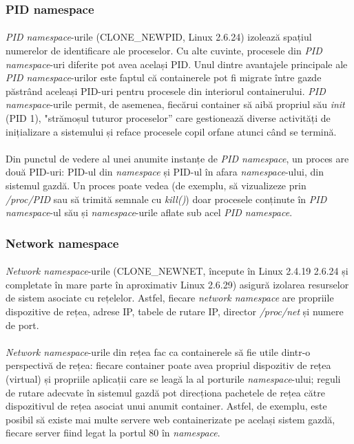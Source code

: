         \subsubsection{PID namespace}
            \paragraph{} \textit{PID namespace}-urile (CLONE\_NEWPID, Linux 2.6.24) izolează spațiul numerelor de identificare ale proceselor. Cu alte cuvinte, procesele din \textit{PID namespace}-uri diferite pot avea același PID. Unul dintre avantajele principale ale \textit{PID namespace}-urilor este faptul că containerele pot fi migrate între gazde păstrând aceleași PID-uri pentru procesele din interiorul containerului. \textit{PID namespace}-urile permit, de asemenea, fiecărui container să aibă propriul său \textit{init} (PID 1), "strămoșul tuturor proceselor” care gestionează diverse activități de inițializare a sistemului și reface procesele copil orfane atunci când se termină. \cite{ns:lwn}
            \paragraph{} Din punctul de vedere al unei anumite instanțe de \textit{PID namespace}, un proces are două PID-uri: PID-ul din \textit{namespace} și PID-ul în afara \textit{namespace}-ului, din sistemul gazdă. Un proces poate vedea (de exemplu, să vizualizeze prin \textit{/proc/PID} sau să trimită semnale cu \textit{kill()}) doar procesele conținute în \textit{PID namespace}-ul său și \textit{namespace}-urile aflate sub acel \textit{PID namespace}. \cite{ns:lwn}

        \subsubsection{Network namespace}
            \paragraph{} \textit{Network namespace}-urile (CLONE\_NEWNET, începute în Linux 2.4.19 2.6.24 și completate în mare parte în aproximativ Linux 2.6.29) asigură izolarea resurselor de sistem asociate cu rețelelor. Astfel, fiecare \textit{network namespace} are propriile dispozitive de rețea, adrese IP, tabele de rutare IP, director \textit{/proc/net} și numere de port. \cite{ns:lwn}
            \paragraph{} \textit{Network namespace}-urile din rețea fac ca containerele să fie utile dintr-o perspectivă de rețea: fiecare container poate avea propriul dispozitiv de rețea (virtual) și propriile aplicații care se leagă la al porturile  \textit{namespace}-ului; reguli de rutare adecvate în sistemul gazdă pot direcționa pachetele de rețea către dispozitivul de rețea asociat unui anumit container. Astfel, de exemplu, este posibil să existe mai multe servere web containerizate pe același sistem gazdă, fiecare server fiind legat la portul 80 în \textit{namespace}. \cite{ns:lwn}

